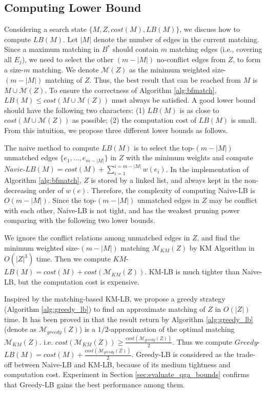 \vspace{-0.1in}
\subsection{Computing Lower Bound} \label{sec:lower_bound}
Considering a search state $\{M, Z, cost(M), LB(M)\}$, we discuss how to compute $LB(M)$. Let $|M|$ denote the number of edges in the current matching. Since a maximum matching in $B^{*}$ should contain $m$ matching edges (i.e., covering all $E_j$), we need to select the other $(m-|M|)$ no-conflict edges from $Z$, to form a size-$m$ matching. We denote  $\mathcal{M}(Z)$ as the minimum weighted size-$(m-|M|)$ matching of $Z$. Thus, the best result that can be reached from $M$ is $M \cup \mathcal{M}(Z)$. To ensure the correctness of Algorithm \ref{alg:bfmatch}, $LB(M) \le cost(M \cup \mathcal{M}(Z))$ must always be satisfied. A good lower bound should have the following two characters: (1)  $LB(M)$ is as close to $cost(M \cup \mathcal{M}(Z))$ as possible; (2) the computation cost of $LB(M)$ is small. From this intuition, we propose three different lower bounds as follows.

The naive method to compute $LB(M)$ is to select the top-$(m-|M|)$ unmatched edges $\{e_1,...,e_{m-|M|}\}$ in $Z$ with the minimum weights and compute $Navie$-$LB(M) = cost(M) + \sum\nolimits_{i = 1}^{i = m  - |M|} {w(e_i)}$. In the implementation of Algorithm \ref{alg:bfmatch}, $Z$ is stored by a linked list, and always kept in the non-decreasing order of $w(e)$. Therefore, the complexity of computing Naive-LB is $O(m-|M|)$. Since the top-$(m-|M|)$ unmatched edges in $Z$ may be conflict with each other, Naive-LB is not tight, and has the weakest pruning power comparing with the following two lower bounds.

We ignore the conflict relations among unmatched edges in $Z$, and find the minimum weighted size-$(m-|M|)$ matching $\mathcal{M}_{KM}(Z)$ by KM Algorithm \cite{kuhn1955hungarian} in $O(|Z|^3)$ time. Then we compute $KM$-$LB(M)= cost(M) + cost(\mathcal{M}_{KM}(Z))$. KM-LB is much tighter than Naive-LB, but the computation cost is expensive.

Inspired by the matching-based KM-LB, we propose a greedy strategy (Algorithm \ref{alg:greedy_lb}) to find an approximate matching of $Z$ in $O(|Z|)$ time. It has been proved in \cite{preis1999linear} that the result return by Algorithm \ref{alg:greedy_lb} (denote as $\mathcal{M}_{greedy}(Z)$) is a $1/2$-approximation of the optimal matching $\mathcal{M}_{KM}(Z)$. i.e. $cost(\mathcal{M}_{KM}(Z)) \ge \frac{cost(\mathcal{M}_{greedy}(Z))}{2}$. Thus we compute $Greedy$-$LB(M)= cost(M) + \frac{cost(\mathcal{M}_{greedy}(Z))}{2}$. Greedy-LB is considered as the trade-off between Naive-LB and KM-LB, because of its medium tightness and computation cost. Experiment in Section \ref{sec:evaluate_qga_bounds} confirms that Greedy-LB gains the best performance among them.

